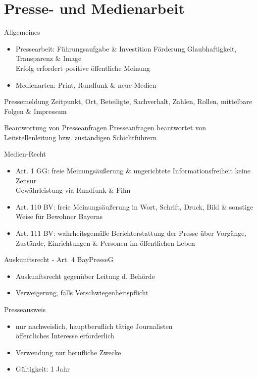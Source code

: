\section{Presse- und Medienarbeit}
\begin{sectionbox}{Allgemeines}
    \begin{itemize}
        \item Pressearbeit: Führungsaufgabe \& Investition
        \ra Förderung Glaubhaftigkeit, Transparenz \& Image\\
        \ra Erfolg erfordert positive öffentliche Meinung
        \item Medienarten: Print, Rundfunk \& neue Medien
    \end{itemize}
\end{sectionbox}
\begin{hintbox}{Pressemeldung}
    Zeitpunkt, Ort, Beteiligte, Sachverhalt, Zahlen, Rollen, mittelbare Folgen \& Impressum
\end{hintbox}
\begin{warningbox}{Beantwortung von Presseanfragen}
    Presseanfragen beantwortet von Leitstellenleitung bzw. zuständigen Schichtführern
\end{warningbox}
\begin{sectionbox}{Medien-Recht}
    \begin{itemize}
        \item Art. 1 GG: freie Meinungsäußerung \& ungerichtete Informationsfreiheit \ra keine Zensur\\
        \ra Gewährleistung via Rundfunk \& Film\\
        \item Art. 110 BV: freie Meinungsäußerung in Wort, Schrift, Druck, Bild \& sonstige Weise für Bewohner Bayerns
        \item Art. 111 BV: wahrheitsgemäße Berichterstattung der Presse über Vorgänge, Zustände, Einrichtungen \& Personen im öffentlichen Leben
    \end{itemize}
\end{sectionbox}
\begin{sectionbox}{Auskunftsrecht - Art. 4 BayPresseG}
    \begin{itemize}
        \item Auskunftsrecht gegenüber Leitung d. Behörde
        \item Verweigerung, falls Verschwiegenheitspflicht
    \end{itemize}
\end{sectionbox}
\begin{sectionbox}{Presseausweis}
    \begin{itemize}
        \item nur nachweislich, hauptberuflich tätige Journalisten\\
        \ra öffentliches Interesse erforderlich
        \item Verwendung nur berufliche Zwecke
        \item Gültigkeit: 1 Jahr
    \end{itemize}
\end{sectionbox}